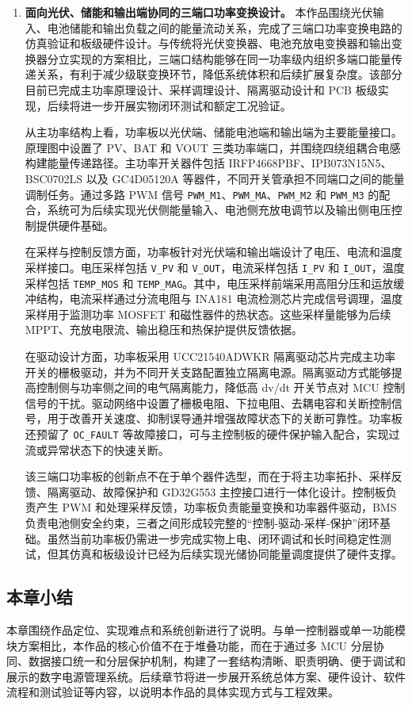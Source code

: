 \begin{enumerate}[label=\arabic*、, leftmargin=*, itemsep=0.8ex, parsep=0pt, topsep=0.5ex]
   \item \textbf{面向光伏、储能和输出端协同的三端口功率变换设计。}  
  本作品围绕光伏输入、电池储能和输出负载之间的能量流动关系，完成了三端口功率变换电路的仿真验证和板级硬件设计。与传统将光伏变换器、电池充放电变换器和输出变换器分立实现的方案相比，三端口结构能够在同一功率级内组织多端口能量传递关系，有利于减少级联变换环节，降低系统体积和后续扩展复杂度。该部分目前已完成主功率原理设计、采样调理设计、隔离驱动设计和 PCB 板级实现，后续将进一步开展实物闭环测试和额定工况验证。

  从主功率结构上看，功率板以光伏端、储能电池端和输出端为主要能量接口。原理图中设置了 PV、BAT 和 VOUT 三类功率端口，并围绕四绕组耦合电感构建能量传递路径。主功率开关器件包括 IRFP4668PBF、IPB073N15N5、BSC0702LS 以及 GC4D05120A 等器件，不同开关管承担不同端口之间的能量调制任务。通过多路 PWM 信号 \texttt{PWM\_M1}、\texttt{PWM\_MA}、\texttt{PWM\_M2} 和 \texttt{PWM\_M3} 的配合，系统可为后续实现光伏侧能量输入、电池侧充放电调节以及输出侧电压控制提供硬件基础。

  在采样与控制反馈方面，功率板针对光伏端和输出端设计了电压、电流和温度采样接口。电压采样包括 \texttt{V\_PV} 和 \texttt{V\_OUT}，电流采样包括 \texttt{I\_PV} 和 \texttt{I\_OUT}，温度采样包括 \texttt{TEMP\_MOS} 和 \texttt{TEMP\_MAG}。其中，电压采样前端采用高阻分压和运放缓冲结构，电流采样通过分流电阻与 INA181 电流检测芯片完成信号调理，温度采样用于监测功率 MOSFET 和磁性器件的热状态。这些采样量能够为后续 MPPT、充放电限流、输出稳压和热保护提供反馈依据。

  在驱动设计方面，功率板采用 UCC21540ADWKR 隔离驱动芯片完成主功率开关的栅极驱动，并为不同开关支路配置独立隔离电源。隔离驱动方式能够提高控制侧与功率侧之间的电气隔离能力，降低高 dv/dt 开关节点对 MCU 控制信号的干扰。驱动网络中设置了栅极电阻、下拉电阻、去耦电容和关断控制信号，用于改善开关速度、抑制误导通并增强故障状态下的关断可靠性。功率板还预留了 \texttt{OC\_FAULT} 等故障接口，可与主控制板的硬件保护输入配合，实现过流或异常状态下的快速关断。

  该三端口功率板的创新点不在于单个器件选型，而在于将主功率拓扑、采样反馈、隔离驱动、故障保护和 GD32G553 主控接口进行一体化设计。控制板负责产生 PWM 和处理采样反馈，功率板负责能量变换和功率器件驱动，BMS 负责电池侧安全约束，三者之间形成较完整的“控制-驱动-采样-保护”闭环基础。虽然当前功率板仍需进一步完成实物上电、闭环调试和长时间稳定性测试，但其仿真和板级设计已经为后续实现光储协同能量调度提供了硬件支撑。
\end{enumerate}
\subsection{本章小结}

本章围绕作品定位、实现难点和系统创新进行了说明。与单一控制器或单一功能模块方案相比，本作品的核心价值不在于堆叠功能，而在于通过多 MCU 分层协同、数据接口统一和分层保护机制，构建了一套结构清晰、职责明确、便于调试和展示的数字电源管理系统。后续章节将进一步展开系统总体方案、硬件设计、软件流程和测试验证等内容，以说明本作品的具体实现方式与工程效果。